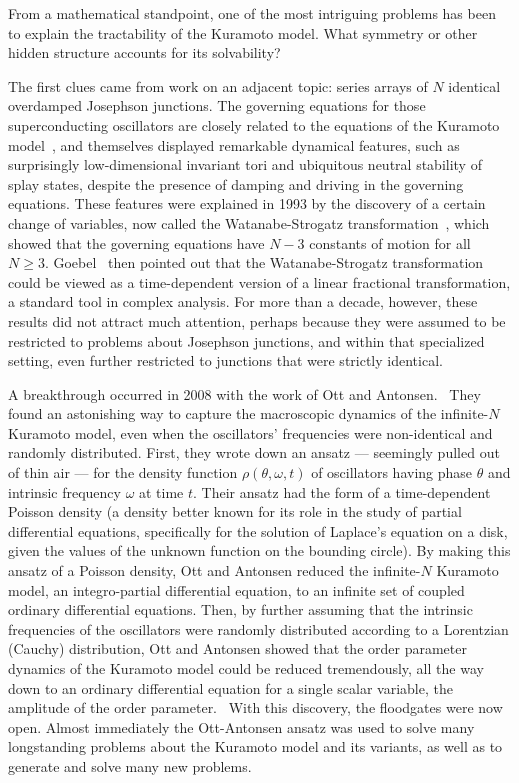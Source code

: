 \documentclass[%
 aip,
 amsmath,amssymb,
 reprint,%
]{revtex4-1}
\begin{document}
From a mathematical standpoint, one of the most intriguing problems has been to  explain the tractability of the Kuramoto model. What symmetry or other hidden structure  accounts for its solvability?  

The first clues came from work on an adjacent topic: series arrays of $N$  identical overdamped Josephson junctions. The governing equations for those superconducting  oscillators are closely related to the equations of the Kuramoto model~\cite{wiesenfeld1996synchronization, wiesenfeld1998frequency}, and themselves displayed  remarkable dynamical features, such as surprisingly low-dimensional invariant tori\cite{tsang1991dynamics,swift1992averaging} and ubiquitous neutral stability of splay states\cite{nichols1992ubiquitous}, despite the presence of  damping and driving in the governing equations. These features were explained in 1993 by the  discovery of a certain change of variables, now called the Watanabe-Strogatz transformation~\cite{watanabe1993integrability,watanabe1994constants},  which showed that the governing equations have $N-3$ constants of motion for all $N \geq 3$. Goebel~\cite{goebel1995comment} then pointed out that the Watanabe-Strogatz transformation could be viewed as a time-dependent version of a linear fractional transformation, a standard tool in complex  analysis. For more than a decade, however, these results did not attract much attention,  perhaps because they were assumed to be restricted to problems about Josephson junctions,  and within that specialized setting, even further restricted to junctions that were strictly identical.  

A breakthrough occurred in 2008 with the work of Ott and Antonsen.~\cite{ott2008low,ott2009long} They found an  astonishing way to capture the macroscopic dynamics of the infinite-$N$ Kuramoto model, even  when the oscillators’ frequencies were non-identical and randomly distributed. First, they  wrote down an ansatz --- seemingly pulled out of thin air --- for the density function $\rho(\theta,  \omega, t)$ of oscillators having phase $\theta$ and intrinsic frequency $\omega$ at time $t$. Their ansatz had the form of a time-dependent Poisson density (a density better known for its  role in the study of partial differential equations, specifically for the solution of Laplace’s  equation on a disk, given the values of the unknown function on the bounding circle). By  making this ansatz of a Poisson density, Ott and Antonsen reduced the infinite-$N$ Kuramoto  model, an integro-partial differential equation, to an infinite set of coupled ordinary differential  equations. Then, by further assuming that the intrinsic frequencies of the oscillators were randomly distributed  according to a Lorentzian (Cauchy) distribution, Ott and Antonsen showed that the order parameter dynamics of the Kuramoto model could be reduced tremendously, all the way down  to an ordinary differential equation for a single scalar variable, the amplitude of the order  parameter.~\cite{ott2008low} With this discovery, the floodgates were now open. Almost immediately the Ott-Antonsen ansatz was used to solve many longstanding problems about the Kuramoto model  and its variants, as well as to generate and solve many new problems.~\cite{pikovsky2015dynamics}  
\end{document}
